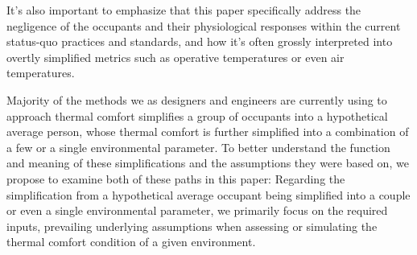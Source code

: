 It's also important to emphasize that this paper specifically address the negligence of the occupants and their physiological responses within the current status-quo practices and standards, and how it's often grossly interpreted into overtly simplified metrics such as operative temperatures or even air temperatures.

Majority of the methods we as designers and engineers are currently using to approach thermal comfort simplifies a group of occupants into a hypothetical average person, whose thermal comfort is further simplified into a combination of a few or a single environmental parameter. To better understand the function and meaning of these simplifications and the assumptions they were based on, we propose to examine both of these paths in this paper: Regarding the simplification from a hypothetical average occupant being simplified into a couple or even a single environmental parameter, we primarily focus on the required inputs, prevailing underlying assumptions when assessing or simulating the thermal comfort condition of a given environment.
